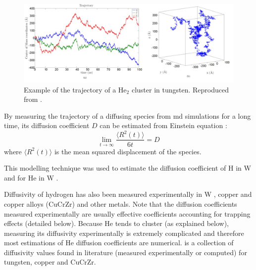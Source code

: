 \begin{figure}
    \centering
    \includegraphics[width=\linewidth]{Figures/Chapter1/faney_md.jpg}
    \caption{Example of the trajectory of a He$_2$ cluster in tungsten. Reproduced from \cite{faney_numerical_2013}.}
\end{figure}

By measuring the trajectory of a diffusing species from \gls{md} simulations for a long time, its diffusion coefficient $D$ can be estimated from Einstein equation \cite{einstein_uber_1905}:
\begin{equation}
    \lim_{t\to\infty} \frac{\langle R^2(t) \rangle}{6t} = D
\end{equation}
where $\langle R^2(t) \rangle$ is the mean squared displacement of the species.

This modelling technique was used to estimate the diffusion coefficient of \gls{H} in \gls{W}  and for \gls{He} in \gls{W} .

Diffusivity of hydrogen has also been measured experimentally in \gls{W} , copper and copper alloys (CuCrZr)  and other metals.
Note that the diffusion coefficients measured experimentally are usually effective coefficients accounting for \gls{trapping} effects (detailed below).
Because \gls{He} tends to cluster (as explained below), measuring its diffusivity experimentally is extremely complicated and therefore most estimations of \gls{He} diffusion coefficients are numerical.
 is a collection of diffusivity values found in literature (measured experimentally or computed) for tungsten, copper and CuCrZr.

